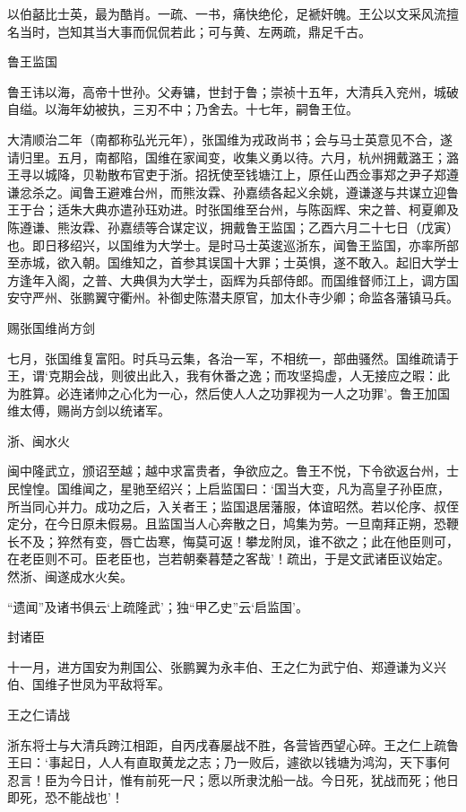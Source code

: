 \documentclass[]{article}
\begin{document}
以伯嚭比士英，最为酷肖。一疏、一书，痛快绝伦，足褫奸魄。王公以文采风流擅名当时，岂知其当大事而侃侃若此；可与黄、左两疏，鼎足千古。

鲁王监国

鲁王讳以海，高帝十世孙。父寿镛，世封于鲁；崇祯十五年，大清兵入兖州，城破自缢。以海年幼被执，三刃不中；乃舍去。十七年，嗣鲁王位。

大清顺治二年（南都称弘光元年），张国维为戎政尚书；会与马士英意见不合，遂请归里。五月，南都陷，国维在家闻变，收集义勇以待。六月，杭州拥戴潞王；潞王寻以城降，贝勒散布官吏于浙。招抚使至钱塘江上，原任山西佥事郑之尹子郑遵谦忿杀之。闻鲁王避难台州，而熊汝霖、孙嘉绩各起义余姚，遵谦遂与共谋立迎鲁王于台；适朱大典亦遣孙珏劝进。时张国维至台州，与陈函辉、宋之普、柯夏卿及陈遵谦、熊汝霖、孙嘉绩等合谋定议，拥戴鲁王监国；乙酉六月二十七日（戊寅）也。即日移绍兴，以国维为大学士。是时马士英逡巡浙东，闻鲁王监国，亦率所部至赤城，欲入朝。国维知之，首参其误国十大罪；士英惧，遂不敢入。起旧大学士方逢年入阁，之普、大典俱为大学士，函辉为兵部侍郎。而国维督师江上，调方国安守严州、张鹏翼守衢州。补御史陈潜夫原官，加太仆寺少卿；命监各藩镇马兵。

赐张国维尚方剑

七月，张国维复富阳。时兵马云集，各治一军，不相统一，部曲骚然。国维疏请于王，谓`克期会战，则彼出此入，我有休番之逸；而攻坚捣虚，人无接应之暇：此为胜算。必连诸帅之心化为一心，然后使人人之功罪视为一人之功罪'。鲁王加国维太傅，赐尚方剑以统诸军。

浙、闽水火

闽中隆武立，颁诏至越；越中求富贵者，争欲应之。鲁王不悦，下令欲返台州，士民惶惶。国维闻之，星驰至绍兴；上启监国曰：`国当大变，凡为高皇子孙臣庶，所当同心并力。成功之后，入关者王；监国退居藩服，体谊昭然。若以伦序、叔侄定分，在今日原未假易。且监国当人心奔散之日，鸠集为劳。一旦南拜正朔，恐鞭长不及；猝然有变，唇亡齿寒，悔莫可返！攀龙附凤，谁不欲之；此在他臣则可，在老臣则不可。臣老臣也，岂若朝秦暮楚之客哉'！疏出，于是文武诸臣议始定。然浙、闽遂成水火矣。

``遗闻''及诸书俱云`上疏隆武'；独``甲乙史''云`启监国'。

封诸臣

十一月，进方国安为荆国公、张鹏翼为永丰伯、王之仁为武宁伯、郑遵谦为义兴伯、国维子世凤为平敌将军。

王之仁请战

浙东将士与大清兵跨江相距，自丙戌春屡战不胜，各营皆西望心碎。王之仁上疏鲁王曰：`事起日，人人有直取黄龙之志；乃一败后，遽欲以钱塘为鸿沟，天下事何忍言！臣为今日计，惟有前死一尺；愿以所隶沈船一战。今日死，犹战而死；他日即死，恐不能战也'！
\end{document}
